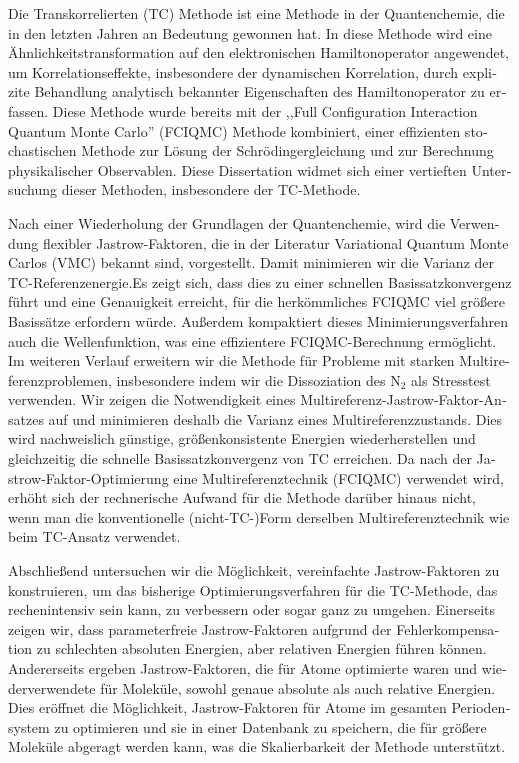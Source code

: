 \cleardoublepage
\begin{otherlanguage}{ngerman}

Die Transkorrelierten (TC) Methode ist eine Methode in der Quantenchemie, die in den letzten Jahren an Bedeutung gewonnen hat. In diese Methode wird eine Ähnlichkeitstransformation auf den elektronischen Hamiltonoperator angewendet, um Korrelationseffekte, insbesondere der dynamischen Korrelation, durch explizite Behandlung analytisch bekannter Eigenschaften des Hamiltonoperator zu erfassen. Diese Methode wurde bereits mit der ,,Full Configuration Interaction Quantum Monte Carlo'' (FCIQMC) Methode kombiniert, einer effizienten stochastischen Methode zur Lösung der Schrödingergleichung und zur Berechnung physikalischer Observablen. Diese Dissertation widmet sich einer vertieften Untersuchung dieser Methoden, insbesondere der TC-Methode.

Nach einer Wiederholung der Grundlagen der Quantenchemie, wird die Verwendung flexibler Jastrow-Faktoren, die in der Literatur Variational Quantum Monte Carlos (VMC) bekannt sind, vorgestellt. Damit minimieren wir die Varianz der TC-Referenzenergie.Es zeigt sich, dass dies zu einer schnellen Basissatzkonvergenz führt und eine Genauigkeit erreicht, für die herkömmliches FCIQMC viel größere Basissätze erfordern würde. Außerdem kompaktiert dieses Minimierungsverfahren auch die Wellenfunktion, was eine effizientere FCIQMC-Berechnung ermöglicht. Im weiteren Verlauf erweitern wir die Methode für Probleme mit starken Multireferenzproblemen, insbesondere indem wir die Dissoziation des N$_2$ als Stresstest verwenden. Wir zeigen die Notwendigkeit eines Multireferenz-Jastrow-Faktor-Ansatzes auf und minimieren deshalb die Varianz eines Multireferenzzustands. Dies wird nachweislich günstige, größenkonsistente Energien wiederherstellen und gleichzeitig die schnelle Basissatzkonvergenz von TC erreichen. Da nach der Jastrow-Faktor-Optimierung eine Multireferenztechnik (FCIQMC) verwendet wird, erhöht sich der rechnerische Aufwand für die Methode darüber hinaus nicht, wenn man die konventionelle (nicht-TC-)Form derselben Multireferenztechnik wie beim TC-Ansatz verwendet.

Abschließend untersuchen wir die Möglichkeit, vereinfachte Jastrow-Faktoren zu konstruieren, um das bisherige Optimierungsverfahren für die TC-Methode, das rechenintensiv sein kann, zu verbessern oder sogar ganz zu umgehen. Einerseits zeigen wir, dass parameterfreie Jastrow-Faktoren aufgrund der Fehlerkompensation zu schlechten absoluten Energien, aber relativen Energien führen können. Andererseits ergeben Jastrow-Faktoren, die für Atome optimierte waren und wiederverwendete für Moleküle, sowohl genaue absolute als auch relative Energien. Dies eröffnet die Möglichkeit, Jastrow-Faktoren für Atome im gesamten Periodensystem zu optimieren und sie in einer Datenbank zu speichern, die für größere Moleküle abgeragt werden kann, was die Skalierbarkeit der Methode unterstützt.

\end{otherlanguage}

